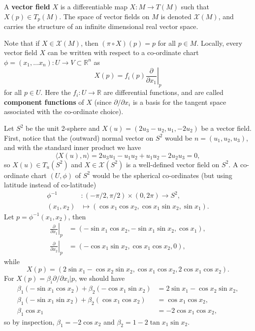 \documentclass[letter-paper]{tufte-book}
\newenvironment{example}[1][Example]{\begin{trivlist}
\item[\hskip \labelsep {\bfseries #1}]}{\end{trivlist}}
\begin{document}
A \textbf{vector field} $X$ is a differentiable map $X: M \to T(M)$ such that $X(p) \in T_p(M)$. The space of vector fields on $M$ is denoted $\mathcal{X}(M)$, and carries the structure of an infinite dimensional real vector space. 

Note that if $X \in \mathcal{X}(M)$, then $(\pi \circ X)(p) = p$ for all $p\in M$. Locally, every vector field $X$ can be written with respect to a co-ordinate chart $\phi = (x_1, \ldots x_n) : U \to V \subset \mathbb{R}^n$ as
\begin{equation}
  X(p) = f_i(p) \left.\frac{\partial}{\partial x_1}\right|_p
\end{equation}
for all $p \in U$. Here the $f_i : U \to \mathbb{R}$ are differential functions, and are called \textbf{component functions} of $X$ (since $\partial/\partial x_i$ is a basis for the tangent space associated with the co-ordinate choice).

\begin{example}
  Let $S^2$ be the unit 2-sphere and $X(u) = (2u_3 - u_2, u_1, -2u_2)$ be a vector field. First, notice that the (outward) normal vector on $S^2$ would be $n = (u_1, u_2, u_3)$, and with the standard inner product we have
  \begin{equation*}
    \langle X(u), n\rangle = 2u_3 u_1 - u_1 u_2 + u_1 u_2 - 2u_2 u_3 = 0,
  \end{equation*}
  so $X(u) \in T_u(S^2)$ and $X \in \mathcal{X}(S^2)$ is a well-defined vector field on $S^2$. A co-ordinate chart $(U, \phi)$ of $S^2$ would be the spherical co-ordinates (but using latitude instead of co-latitude)
  \begin{align*}
    \phi^{-1} &: (-\pi/2, \pi/2) \times (0, 2\pi) \to S^2,\\
    (x_1, x_2) &\mapsto (\cos x_1 \cos x_2, \cos x_1 \sin x_2, \sin x_1).
  \end{align*}
  Let $p = \phi^{-1}(x_1, x_2)$, then
  \begin{align*}
    \left.\frac{\partial}{\partial x_1}\right|_p &= (-\sin x_1 \cos x_2, -\sin x_1 \sin x_2, \cos x_1),\\
    \left.\frac{\partial}{\partial x_2}\right|_p &= (-\cos x_1 \sin x_2, \cos x_1 \cos x_2, 0),
  \end{align*}
  while
  \begin{equation*}
    X(p) = (2\sin x_1 - \cos x_2 \sin x_2, \cos x_1 \cos x_2, 2\cos x_1 \cos x_2).
  \end{equation*}
  For $X(p) = \beta_i \partial / \partial x_i |p$, we should have
  \begin{align*}
    \beta_1 (-\sin x_1 \cos x_2) + \beta_2 (-\cos x_1 \sin x_2) &= 2\sin x_1 - \cos x_2 \sin x_2,\\
    \beta_1 (-\sin x_1 \sin x_2) + \beta_2 (\cos x_1 \cos x_2) &= \cos x_1 \cos x_2,\\
    \beta_1 \cos x_1 &= -2 \cos x_1 \cos x_2,
  \end{align*}
  so by inspection, $\beta_1 = -2\cos x_2$ and $\beta_2 = 1 - 2\tan x_1 \sin x_2$.
\end{example}
\end{document}
